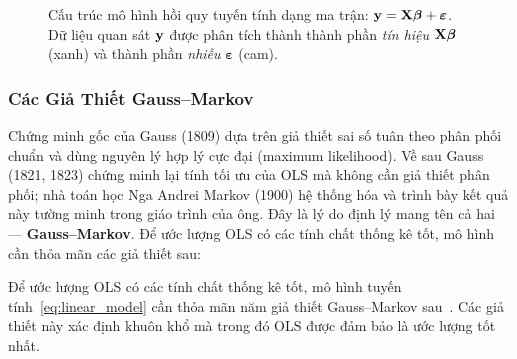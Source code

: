 \begin{figure}[H]
\centering
{}
\caption{Cấu trúc mô hình hồi quy tuyến tính dạng ma trận:
$\mathbf{y} = \mathbf{X}\boldsymbol{\beta} + \boldsymbol{\varepsilon}$.
Dữ liệu quan sát $\mathbf{y}$ được phân tích thành thành phần \textit{tín hiệu}
$\mathbf{X}\boldsymbol{\beta}$ (xanh) và thành phần \textit{nhiễu}
$\boldsymbol{\varepsilon}$ (cam).}
\label{fig:linear_model}
\end{figure}

\subsubsection{Các Giả Thiết Gauss–Markov}

Chứng minh gốc của Gauss (1809) dựa trên giả thiết sai số tuân theo phân phối chuẩn và dùng nguyên lý hợp lý cực đại (maximum likelihood). Về sau Gauss (1821, 1823) chứng minh lại tính tối ưu của OLS mà không cần giả thiết phân phối; nhà toán học Nga Andrei Markov (1900) hệ thống hóa và trình bày kết quả này tường minh trong giáo trình của ông. Đây là lý do định lý mang tên cả hai --- \textbf{Gauss--Markov}. Để ước lượng OLS có các tính chất thống kê tốt, mô hình cần thỏa mãn các giả thiết sau:

Để ước lượng OLS có các tính chất thống kê tốt, mô hình tuyến tính~\eqref{eq:linear_model}
cần thỏa mãn năm giả thiết Gauss--Markov sau~\cite{wooldridge2013,greene2012}. Các giả thiết này xác định khuôn khổ
mà trong đó OLS được đảm bảo là ước lượng tốt nhất.


